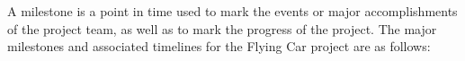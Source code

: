 A milestone is a point in time used to mark the events or major accomplishments of the project team, as well as to mark the progress of the project. The major milestones and associated timelines for the Flying Car project are as follows:


